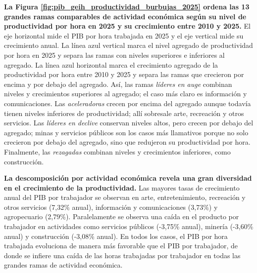 \textbf{La Figura \ref{fig:pib_geih_productividad_burbujas_2025} ordena las 13 grandes ramas comparables de actividad económica según su nivel de productividad por hora en 2025 y su crecimiento entre 2010 y 2025.} El eje horizontal mide el PIB por hora trabajada en 2025 y el eje vertical mide su crecimiento anual. La línea azul vertical marca el nivel agregado de productividad por hora en 2025 y separa las ramas con niveles superiores e inferiores al agregado. La línea azul horizontal marca el crecimiento agregado de la productividad por hora entre 2010 y 2025 y separa las ramas que crecieron por encima y por debajo del agregado. Así, las ramas \emph{líderes en auge} combinan niveles y crecimientos superiores al agregado; el caso más claro es información y comunicaciones. Las \emph{aceleradoras} crecen por encima del agregado aunque todavía tienen niveles inferiores de productividad; allí sobresale arte, recreación y otros servicios. Las \emph{líderes en declive} conservan niveles altos, pero crecen por debajo del agregado; minas y servicios públicos son los casos más llamativos porque no solo crecieron por debajo del agregado, sino que redujeron su productividad por hora. Finalmente, las \emph{rezagadas} combinan niveles y crecimientos inferiores, como construcción.


\textbf{La descomposición por actividad económica revela una gran diversidad en el crecimiento de la productividad.} Las mayores tasas de crecimiento anual del PIB por trabajador se observan en arte, entretenimiento, recreación y otros servicios (7,32\% anual), información y comunicaciones (3,73\%) y agropecuario (2,79\%). Paralelamente se observa una caída en el producto por trabajador en actividades como servicios públicos (-3,75\% anual), minería (-3,60\% anual) y construcción (-3,08\% anual). En todos los casos, el PIB por hora trabajada evoluciona de manera más favorable que el PIB por trabajador, de donde se infiere una caída de las horas trabajadas por trabajador en todas las grandes ramas de actividad económica.

